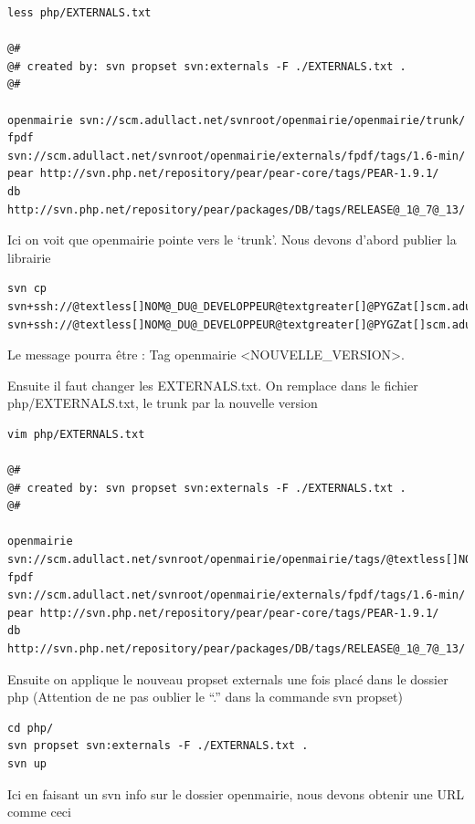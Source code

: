 \documentclass[letterpaper,10pt,french]{manual}
\begin{document}
\begin{Verbatim}[commandchars=@\[\]]
less php/EXTERNALS.txt

@#
@# created by: svn propset svn:externals -F ./EXTERNALS.txt .
@#

openmairie svn://scm.adullact.net/svnroot/openmairie/openmairie/trunk/
fpdf svn://scm.adullact.net/svnroot/openmairie/externals/fpdf/tags/1.6-min/
pear http://svn.php.net/repository/pear/pear-core/tags/PEAR-1.9.1/
db http://svn.php.net/repository/pear/packages/DB/tags/RELEASE@_1@_7@_13/
\end{Verbatim}

Ici on voit que openmairie pointe vers le `trunk'. Nous devons d'abord publier
la librairie

\begin{Verbatim}[commandchars=@\[\]]
svn cp svn+ssh://@textless[]NOM@_DU@_DEVELOPPEUR@textgreater[]@PYGZat[]scm.adullact.net/openmairie/openmairie/trunk svn+ssh://@textless[]NOM@_DU@_DEVELOPPEUR@textgreater[]@PYGZat[]scm.adullact.net/openmairie/openmairie/tags/@textless[]NOUVELLE@_VERSION@textgreater[]
\end{Verbatim}

Le message pourra être : Tag openmairie \textless{}NOUVELLE\_VERSION\textgreater{}.

Ensuite il faut changer les EXTERNALS.txt. On remplace dans le fichier
php/EXTERNALS.txt, le trunk par la nouvelle version

\begin{Verbatim}[commandchars=@\[\]]
vim php/EXTERNALS.txt

@#
@# created by: svn propset svn:externals -F ./EXTERNALS.txt .
@#

openmairie svn://scm.adullact.net/svnroot/openmairie/openmairie/tags/@textless[]NOUVELLE@_VERSION@textgreater[]/
fpdf svn://scm.adullact.net/svnroot/openmairie/externals/fpdf/tags/1.6-min/
pear http://svn.php.net/repository/pear/pear-core/tags/PEAR-1.9.1/
db http://svn.php.net/repository/pear/packages/DB/tags/RELEASE@_1@_7@_13/
\end{Verbatim}

Ensuite on applique le nouveau propset externals une fois placé dans le dossier
php (Attention de ne pas oublier le ``.'' dans la commande svn propset)

\begin{Verbatim}[commandchars=@\[\]]
cd php/
svn propset svn:externals -F ./EXTERNALS.txt .
svn up
\end{Verbatim}

Ici en faisant un svn info sur le dossier openmairie, nous devons obtenir une
URL comme ceci
\end{document}
